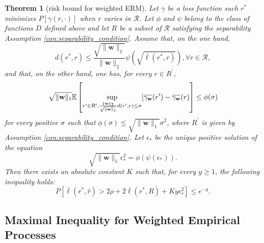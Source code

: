 \documentclass[letterpaper]{article} %
\newtheorem{theorem}{Theorem}
\newcommand{\E}{\mathbb{E}}
\newcommand{\Pro}{P}
\newcommand{\overbar}[1]{\mkern 1.5mu\overline{\mkern-1.5mu#1\mkern-1.5mu}\mkern 1.5mu}
\newcommand*\cen[1]{\overbar{#1}}
\newcommand{\weight}{\mathbf{w}}
\newcommand{\relossf}{\bar{\ell}}
\newcommand{\cenprocess}[1]{\cen{\gamma_{#1}}}
\newcommand{\normo}[1]{\|#1\|_1}
\begin{document}
\begin{theorem}[risk bound for weighted ERM]
    \label{th:weighted_erm_risk_bounds}
    Let $\gamma$ be a loss function such $r^*$ minimizes $\Pro[\gamma(r,\cdot)]$ when $r$ varies in $\mathcal{R}$. Let $\phi$ and $\psi$ belong to the class of functions $D$ defined above and let $R$ be a subset of $\mathcal R$ satisfying the separability Assumption \ref{con:separability_condition}. Assume that, on the one hand,
    \begin{equation}
        \label{eq:weighted_erm_risk_bound_con1}
        d(r^*,r)\le \frac{\sqrt{\normo{\weight{}}}}{\|\weight{}\|_2}\psi(\sqrt{\relossf(r^*,r)}), \forall r\in \mathcal R,
    \end{equation}
    and that, on the other hand, one has, for every $r\in R^\prime$,
    \begin{equation}
        \label{eq:weighted_erm_risk_bound_con2}
        \sqrt{\normo{\weight{}}}\E\left[\sup_{r'\in R^\prime,\frac{\|\weight{}\|_2}{\sqrt{\normo{\weight{}}}}d(r',r)\le \sigma}[\cenprocess{\weight}(r')-\cenprocess{\weight}(r)\right]\le \phi(\sigma)
    \end{equation}
    for every positive $\sigma$ such that $\phi(\sigma)\le \sqrt{\normo{\weight{}}}\sigma^2$, where $R^\prime$ is given by Assumption \ref{con:separability_condition}. Let $\epsilon_*$ be the unique positive solution of the equation
    \begin{equation}
        \label{eq:risk_bound_con3}
        \sqrt{\normo{\weight{}}}\epsilon_*^2=\phi(\psi(\epsilon_*)).
    \end{equation}
    Then there exists an absolute constant $K$ such that, for every $y\ge 1$, the following inequality holds:
    \begin{equation}
        \label{eq:risk_bound_probability}
        \Pro\left[\relossf(r^*,\hat{r})>2\rho+2\relossf(r^*,R)+K y\epsilon_*^2\right]\le e^{-y}.
    \end{equation}
\end{theorem}


\subsection{Maximal Inequality for Weighted Empirical Processes} %
\label{sub:maximal_inequality_for_weighted_processes}

\end{document}
